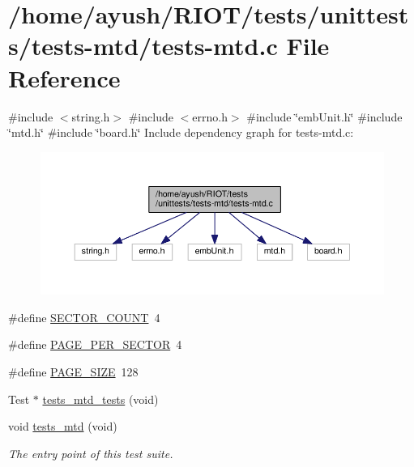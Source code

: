 \hypertarget{tests-mtd_8c}{}\section{/home/ayush/\+R\+I\+O\+T/tests/unittests/tests-\/mtd/tests-\/mtd.c File Reference}
\label{tests-mtd_8c}
{\ttfamily \#include $<$string.\+h$>$}\newline
{\ttfamily \#include $<$errno.\+h$>$}\newline
{\ttfamily \#include \char`\"{}emb\+Unit.\+h\char`\"{}}\newline
{\ttfamily \#include \char`\"{}mtd.\+h\char`\"{}}\newline
{\ttfamily \#include \char`\"{}board.\+h\char`\"{}}\newline
Include dependency graph for tests-\/mtd.c\+:
\nopagebreak
\begin{figure}[H]
\begin{center}
\leavevmode
\includegraphics[width=350pt]{tests-mtd_8c__incl}
\end{center}
\end{figure}
\begin{DoxyCompactItemize}
\item 
\#define \hyperlink{tests-mtd_8c_a2f4c02b9bb3a11b16f4f7dfec9333481}{S\+E\+C\+T\+O\+R\+\_\+\+C\+O\+U\+NT}~4
\item 
\#define \hyperlink{tests-mtd_8c_a2494f21e4797c699def86fbbbd858fb1}{P\+A\+G\+E\+\_\+\+P\+E\+R\+\_\+\+S\+E\+C\+T\+OR}~4
\item 
\#define \hyperlink{tests-mtd_8c_a7d467c1d283fdfa1f2081ba1e0d01b6e}{P\+A\+G\+E\+\_\+\+S\+I\+ZE}~128
\item 
Test $\ast$ \hyperlink{tests-mtd_8c_a0b45a8d3b915b478bf23efd0717e639a}{tests\+\_\+mtd\+\_\+tests} (void)
\item 
void \hyperlink{group__unittests_gad7854ffe9d06ab8bcefaf3b778460f2a}{tests\+\_\+mtd} (void)
\begin{DoxyCompactList}\small\item\em The entry point of this test suite. \end{DoxyCompactList}\end{DoxyCompactItemize}


